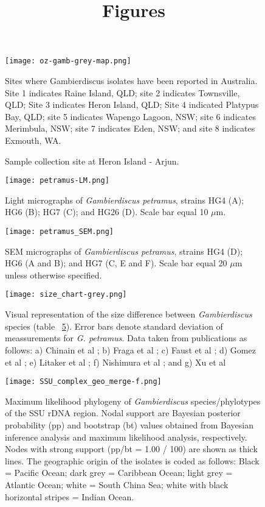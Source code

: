 \documentclass[12pt]{article}
\title{Figures}
\begin{document}
\begin{figure} 
\texttt{[image: oz-gamb-grey-map.png]} 
\caption{Sites where Gambierdiscus isolates have been reported in Australia. Site 1 indicates Raine Island, QLD; site 2 indicates Townsville, QLD; Site 3 indicates Heron Island, QLD; Site 4 indicated Platypus Bay, QLD; site 5 indicates Wapengo Lagoon, NSW; site 6 indicates Merimbula, NSW; site 7 indicates Eden, NSW; and site 8 indicates Exmouth, WA.​} 
\label{fig:OzSites}
\end{figure} 

\FloatBarrier 
\begin{figure} 
\caption{Sample collection site at Heron Island - Arjun.} 
\label{fig:HeronMap}
\end{figure} 
\FloatBarrier 

\begin{figure} 
\texttt{[image: petramus-LM.png]} 
\caption{Light micrographs of \emph{Gambierdiscus petramus}, strains HG4 (A); HG6 (B); HG7 (C); and HG26 (D). Scale bar equal 10 $\mu$m.​} 
\label{fig:PetLM}
\end{figure} 

\FloatBarrier 
\begin{figure} 
\texttt{[image: petramus\_SEM.png]} 
\caption{SEM micrographs of \emph{Gambierdiscus petramus}, strains HG4 (D); HG6 (A and B); and HG7 (C, E and F). Scale bar equal 20 $\mu$m unless otherwise specified.} 
\label{fig:PetSEM}
\end{figure} 
\FloatBarrier 

\FloatBarrier 
\begin{figure} 
\texttt{[image: size\_chart-grey.png]} 
\caption{Visual representation of the size difference between \emph{Gambierdiscus} species (table ~\ref{fig:SizeGraph}). Error bars denote standard deviation of meassurements for \emph{G. petramus}. Data taken from publications as follows: a) Chinain et al \citep{chinain1999morphology}; b) Fraga et al \citep{fraga2014genus}; c) Faust et al \citep{faust1995observation}; d) Gomez et al \citep{gomez2015fukuyoa}; e) Litaker et al \citep{litaker2009taxonomy}; f) Nishimura et al \citep{nishimura2014morphology}; and g) Xu et al \citep{xu2014distribution}} 
\label{fig:SizeGraph}
\end{figure} 
\FloatBarrier 

\begin{figure} 
\texttt{[image: SSU\_complex\_geo\_merge-f.png]} 
\caption{Maximum likelihood phylogeny of \textit{Gambierdiscus} species/phylotypes of the SSU rDNA region. Nodal support are Bayesian posterior probability (pp) and bootstrap (bt) values obtained from Bayesian inference analysis and maximum likelihood analysis, respectively. Nodes with strong support (pp/bt = 1.00 / 100) are shown as thick lines. The geographic origin of the isolates is coded as follows: Black = Pacific Ocean; dark grey = Caribbean Ocean; light grey = Atlantic Ocean; white = South China Sea; white with black horizontal stripes = Indian Ocean.}
\label{fig:HGSSU} 
\end{figure} 
\FloatBarrier 
\end{document}
